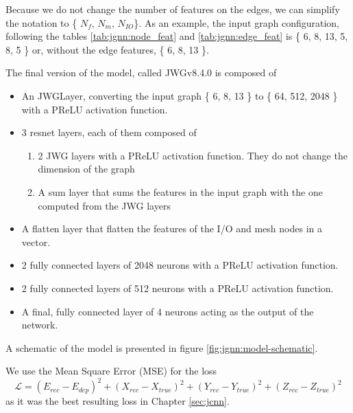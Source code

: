 \documentclass[../main.tex]{subfiles}
\begin{document}
Because we do not change the number of features on the edges, we can simplify the notation to \{{\color{red} $N_{f}$}, {\color{Dandelion} $N_{m}$}, {\color{blue} $N_{IO}$}\}. As an example, the input graph configuration, following the tables \ref{tab:jgnn:node_feat} and \ref{tab:jgnn:edge_feat} is \{{\color{red} 6}, {\color{Dandelion} 8}, {\color{blue} 13}, 5, 8, 5 \} or, without the edge features, \{{\color{red} 6}, {\color{Dandelion} 8}, {\color{blue} 13} \}.

The final version of the model, called JWGv8.4.0 is composed of
\begin{itemize}
  \item An JWGLayer, converting the input graph \{{\color{red} 6}, {\color{Dandelion} 8}, {\color{blue} 13} \} to \{ 64, 512, 2048 \} with a PReLU activation function.
  \item 3 resnet layers, each of them composed of
    \begin{enumerate}
      \item 2 JWG layers with a PReLU activation function. They do not change the dimension of the graph
      \item A sum layer that sums the features in the input graph with the one computed from the JWG layers
    \end{enumerate}
  \item A flatten layer that flatten the features of the I/O and mesh nodes in a vector.
  \item 2 fully connected layers of 2048 neurons with a PReLU activation function.
  \item 2 fully connected layers of 512 neurons with a PReLU activation function.
  \item A final, fully connected layer of 4 neurons acting as the output of the network.
\end{itemize}
A schematic of the model is presented in figure \ref{fig:jgnn:model-schematic}.

We use the Mean Square Error (MSE) for the loss
\begin{equation}
  \mathcal{L} = (E_{rec} - E_{dep})^2 + (X_{rec} - X_{true})^2 + (Y_{rec} - Y_{true})^2 + (Z_{rec} - Z_{true})^2
\end{equation}
as it was the best resulting loss in Chapter \ref{sec:jcnn}.
\end{document}
